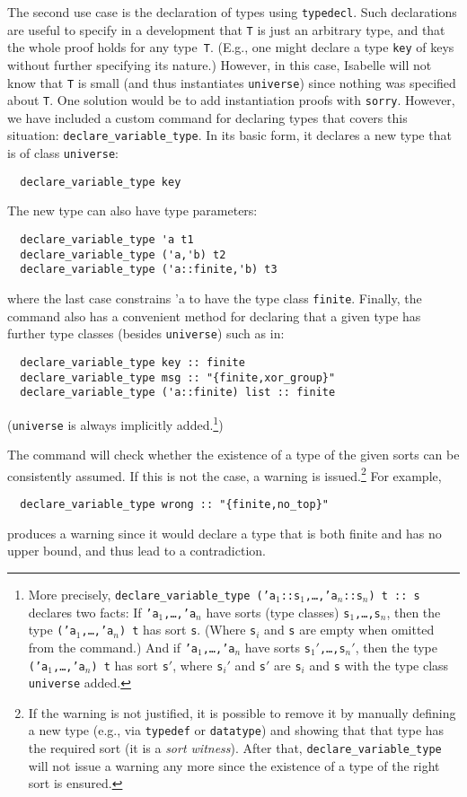 \documentclass{article}
\begin{document}
The second use case is the declaration of types using
\texttt{typedecl}. Such declarations are useful to specify in a
development that \texttt{T} is just an arbitrary type, and that the
whole proof holds for any type~\texttt{T}. (E.g., one might declare a
type \texttt{key} of keys without further specifying its nature.)
However, in this case, Isabelle will not know that \texttt{T} is
small (and thus instantiates \texttt{universe}) since
nothing was specified about \texttt{T}. One solution would be to add
instantiation proofs with \texttt{sorry}. However, we have included a
custom command for declaring types that covers this situation:
\texttt{declare\_variable\_type}. In its basic form, it declares a new
type that is of class \texttt{universe}:
\begin{lstlisting}
  declare_variable_type key
\end{lstlisting}
The new type can also have type parameters:
\begin{lstlisting}
  declare_variable_type 'a t1
  declare_variable_type ('a,'b) t2
  declare_variable_type ('a::finite,'b) t3
\end{lstlisting}
where the last case constrains 'a to have the type class
\texttt{finite}.  Finally, the command also has a convenient method
for declaring that a given type has further type classes (besides \texttt{universe}) such as in:
\begin{lstlisting}
  declare_variable_type key :: finite
  declare_variable_type msg :: "{finite,xor_group}"
  declare_variable_type ('a::finite) list :: finite
\end{lstlisting}
(\texttt{universe} is always implicitly added.\footnote{More precisely,
  \texttt{declare\_variable\_type\ ('a$_1$::s$_1$,\dots,'a$_n$::s$_n$) t :: s}
  declares two facts: If \texttt{'a$_1$,\dots,'a$_n$} have sorts (type classes)
  \texttt{s$_1$,\dots,s$_n$}, then the type \texttt{('a$_1$,\dots,'a$_n$) t}
  has sort \texttt{s}. (Where \texttt{s$_i$} and \texttt{s} are empty when omitted from the command.)
  And
  if \texttt{'a$_1$,\dots,'a$_n$} have sorts
  \texttt{s$_1'$,\dots,s$_n'$}, then the type \texttt{('a$_1$,\dots,'a$_n$) t}
  has sort \texttt{s$'$}, where \texttt{s$_i'$} and \texttt{s$'$} are
  \texttt{s$_i$} and \texttt{s} with the type class \texttt{universe} added.})

The command will check whether the existence of a type of the given
sorts can be consistently assumed.  If this is not the case, a warning
is issued.\footnote{If the warning is not justified, it is possible to
  remove it by manually defining a new type (e.g., via
  \texttt{typedef} or \texttt{datatype}) and showing that that type
  has the required sort (it is a \emph{sort witness}). After that,
  \texttt{declare\_variable\_type} will not issue a warning any more
  since the existence of a type of the right sort is ensured.}  For
example,
\begin{lstlisting}
  declare_variable_type wrong :: "{finite,no_top}"
\end{lstlisting}
produces a warning since it would declare a type that is both finite
and has no upper bound, and thus lead to a contradiction.
\end{document}
